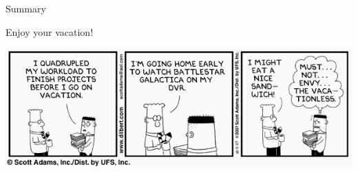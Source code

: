 \begin{frame}{Summary}
  \begin{center}
  \huge{Enjoy your vacation!}    

  
  \includegraphics[scale=0.6]{figures/dilbert}
  \end{center}
\end{frame}


